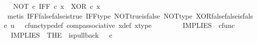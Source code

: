 \begin{isabellebody}
\ \isamarkupfalse%
\ {\isachardoublequoteopen}{\isacharparenleft}{\kern0pt}NOT\ {\isasymcirc}\isactrlsub c\ IFF{\isacharparenright}{\kern0pt}\ {\isasymcirc}\isactrlsub c\ x\ {\isacharequal}{\kern0pt}\ XOR\ {\isasymcirc}\isactrlsub c\ x{\isachardoublequoteclose}\isanewline
\ \ \ \ \ \ \ \ \isamarkupfalse%
\ {\isacharparenleft}{\kern0pt}metis\ IFF{\isacharunderscore}{\kern0pt}false{\isacharunderscore}{\kern0pt}false{\isacharunderscore}{\kern0pt}is{\isacharunderscore}{\kern0pt}true\ IFF{\isacharunderscore}{\kern0pt}type\ NOT{\isacharunderscore}{\kern0pt}true{\isacharunderscore}{\kern0pt}is{\isacharunderscore}{\kern0pt}false\ NOT{\isacharunderscore}{\kern0pt}type\ XOR{\isacharunderscore}{\kern0pt}false{\isacharunderscore}{\kern0pt}false{\isacharunderscore}{\kern0pt}is{\isacharunderscore}{\kern0pt}false\ {\isacartoucheopen}u\ {\isacharequal}{\kern0pt}\ {\isasymf}{\isacartoucheclose}\ cfunc{\isacharunderscore}{\kern0pt}type{\isacharunderscore}{\kern0pt}def\ comp{\isacharunderscore}{\kern0pt}associative\ x{\isacharunderscore}{\kern0pt}def\ x{\isacharunderscore}{\kern0pt}type{\isacharparenright}{\kern0pt}\isanewline
\ \ \ \ \isamarkupfalse%
\isanewline
\ \ \isamarkupfalse%
\isanewline
{}\isamarkupfalse%
%
\endisatagproof
{\isafoldproof}%
%
\isadelimproof
%
\endisadelimproof
%
\isadelimdocument
%
\endisadelimdocument
%
\isatagdocument
%
\isamarkuptrue%
%
\endisatagdocument
{\isafolddocument}%
%
\isadelimdocument
%
\endisadelimdocument
{}\isamarkupfalse%
\ IMPLIES\ {\isacharcolon}{\kern0pt}{\isacharcolon}{\kern0pt}\ {\isachardoublequoteopen}cfunc{\isachardoublequoteclose}\ \isanewline
\ \ {\isachardoublequoteopen}IMPLIES\ {\isacharequal}{\kern0pt}\ {\isacharparenleft}{\kern0pt}THE\ {\isasymchi}{\isachardot}{\kern0pt}\ is{\isacharunderscore}{\kern0pt}pullback\ {\isacharparenleft}{\kern0pt}{\isasymone}{\isasymCoprod}{\isacharparenleft}{\kern0pt}{\isasymone}{\isasymCoprod}{\isasymone}{\isacharparenright}{\kern0pt}{\isacharparenright}{\kern0pt}\ {\isasymone}\ {\isacharparenleft}{\kern0pt}{\isasymOmega}{\isasymtimes}\isactrlsub c{\isasymOmega}{\isacharparenright}{\kern0pt}\ {\isasymOmega}\ {\isacharparenleft}{\kern0pt}{\isasymbeta}\isactrlbsub {\isacharparenleft}{\kern0pt}{\isasymone}{\isasymCoprod}{\isacharparenleft}{\kern0pt}{\isasymone}{\isasymCoprod}{\isasymone}{\isacharparenright}{\kern0pt}{\isacharparenright}{\kern0pt}\isactrlesub {\isacharparenright}{\kern0pt}\ {\isasymt}\ {\isacharparenleft}{\kern0pt}{\isasymlangle}{\isasymt}{\isacharcomma}{\kern0pt}\ {\isasymt}{\isasymrangle}{\isasymamalg}\ {\isacharparenleft}{\kern0pt}{\isasymlangle}{\isasymf}{\isacharcomma}{\kern0pt}\ {\isasymf}{\isasymrangle}\ {\isasymamalg}{\isasymlangle}{\isasymf}{\isacharcomma}{\kern0pt}\ {\isasymt}{\isasymrangle}{\isacharparenright}{\kern0pt}{\isacharparenright}{\kern0pt}\ {\isasymchi}{\isacharparenright}{\kern0pt}{\isachardoublequoteclose}\isanewline

\end{isabellebody}
